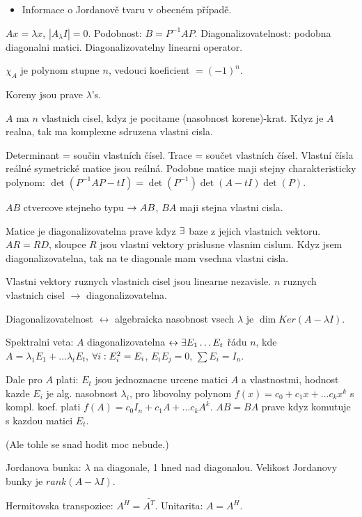 \begin{itemize}
\item Informace o Jordanově tvaru v obecném případě.
\end{itemize}

\begin{understood}
$Ax=\lambda x$, $|A_\lambda I|=0$.
Podobnost: $B=P^{-1} AP$.
Diagonalizovatelnost: podobna diagonalni matici.
Diagonalizovatelny linearni operator.
\end{understood}

$\chi_A$ je polynom stupne $n$, vedouci koeficient $=(-1)^n$.
\begin{understood}
Koreny jsou prave $\lambda$'s.
\end{understood}
$A$ ma $n$ vlastnich cisel, kdyz je pocitame (nasobnost korene)-krat.
Kdyz je $A$ realna, tak ma komplexne sdruzena vlastni cisla.

Determinant = součin vlastních čísel.
Trace = součet vlastních čísel.
Vlastní čísla reálné symetrické matice jsou reálná.
Podobne matice maji stejny charakteristicky polynom:
$\det(P^{-1}AP-tI)=\det(P^{-1})\det(A-tI)\det(P)$.

$AB$ ctvercove stejneho typu $\rightarrow AB$, $BA$ maji stejna vlastni cisla.

Matice je diagonalizovatelna prave kdyz $\exists$ baze z jejich vlastnich vektoru.
$AR=RD$, sloupce $R$ jsou vlastni vektory prislusne vlasnim cislum.
Kdyz jsem diagonalizovatelna, tak na te diagonale mam vsechna vlastni cisla.

Vlastni vektory ruznych vlastnich cisel jsou linearne nezavisle.
$n$ ruznych vlastnich cisel $\rightarrow$ diagonalizovatelna.

Diagonalizovatelnost $\leftrightarrow$
algebraicka nasobnost vsech $\lambda$ je $\dim Ker(A-\lambda I)$.

Spektralni veta: $A$ diagonalizovatelna $\leftrightarrow \exists E_1\ldots E_t$
řádu $n$, kde $A=\lambda_1 E_1+\ldots \lambda_t E_t$,
$\forall i: E_i^2=E_i$, $E_i E_j=0$, $\sum E_i=I_n$.

Dale pro $A$ plati: $E_t$ jsou jednoznacne urcene matici $A$ a vlastnostmi,
hodnost kazde $E_i$ je alg. nasobnost $\lambda_i$,
pro libovolny polynom $f(x)=c_0+c_1 x+\ldots c_k x^k$ s kompl. koef. plati
$f(A)=c_0 I_n + c_1 A+\ldots c_k A^k$.
$AB=BA$ prave kdyz komutuje s kazdou matici $E_t$.

(Ale tohle se snad hodit moc nebude.)

Jordanova bunka: $\lambda$ na diagonale, 1 hned nad diagonalou.
Velikost Jordanovy bunky je $rank(A-\lambda I)$.

Hermitovska transpozice: $A^H=\bar{A^T}$. Unitarita: $A=A^H$.
